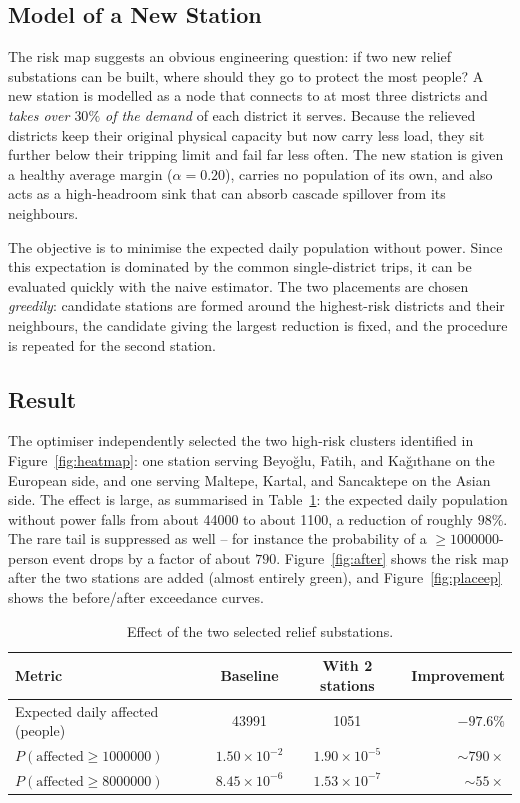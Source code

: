 \documentclass[11pt,a4paper]{article}
\begin{document}
\subsection{Model of a New Station}

The risk map suggests an obvious engineering question: if two new relief
substations can be built, where should they go to protect the most people? A new
station is modelled as a node that connects to at most three districts and
\emph{takes over $30\%$ of the demand} of each district it serves. Because the
relieved districts keep their original physical capacity but now carry less load,
they sit further below their tripping limit and fail far less often. The new
station is given a healthy average margin ($\alpha = 0.20$), carries no
population of its own, and also acts as a high-headroom sink that can absorb
cascade spillover from its neighbours.

The objective is to minimise the expected daily population without power. Since
this expectation is dominated by the common single-district trips, it can be
evaluated quickly with the naive estimator. The two placements are chosen
\emph{greedily}: candidate stations are formed around the highest-risk districts
and their neighbours, the candidate giving the largest reduction is fixed, and
the procedure is repeated for the second station.

\subsection{Result}

The optimiser independently selected the two high-risk clusters identified in
Figure~\ref{fig:heatmap}: one station serving Beyoğlu, Fatih, and Kağıthane on
the European side, and one serving Maltepe, Kartal, and Sancaktepe on the Asian
side. The effect is large, as summarised in Table~\ref{tab:place}: the expected
daily population without power falls from about \num{44000} to about \num{1100},
a reduction of roughly $98\%$. The rare tail is suppressed as well -- for
instance the probability of a $\ge \num{1000000}$-person event drops by a factor
of about $790$. Figure~\ref{fig:after} shows the risk map after the two stations
are added (almost entirely green), and Figure~\ref{fig:placeep} shows the
before/after exceedance curves.

\begin{table}[H]
    \centering
    \caption{Effect of the two selected relief substations.}
    \label{tab:place}
    \begin{tabular}{lccr}
        \toprule
        Metric & Baseline & With 2 stations & Improvement \\
        \midrule
        Expected daily affected (people)        & \num{43991} & \num{1051} & $-97.6\%$ \\
        $P(\text{affected} \ge \num{1000000})$  & $1.50\times 10^{-2}$ & $1.90\times 10^{-5}$ & $\sim\!790\times$ \\
        $P(\text{affected} \ge \num{8000000})$  & $8.45\times 10^{-6}$ & $1.53\times 10^{-7}$ & $\sim\!55\times$ \\
        \bottomrule
    \end{tabular}
\end{table}
\end{document}
